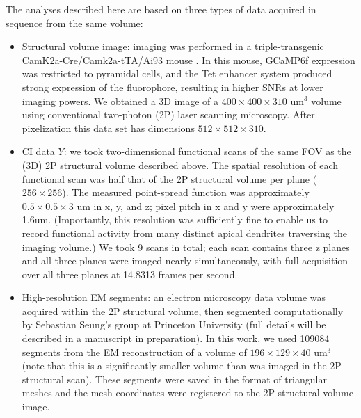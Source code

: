 \documentclass[10pt,letterpaper]{article}
\begin{document}


The analyses described here are based on three types of data acquired in sequence from the same volume:

\begin{itemize}
	\item Structural volume image: imaging was performed in a triple-transgenic CamK2a-Cre/Camk2a-tTA/Ai93 mouse \citep{Madisen2015}. In this mouse, GCaMP6f expression was restricted to pyramidal cells, and the Tet enhancer system produced strong expression of the fluorophore, resulting in higher SNRs at lower imaging powers. We obtained a 3D image of a $400\times 400\times 310$ um$^3$ volume using conventional two-photon (2P) laser scanning microscopy.  After pixelization this data set has dimensions $512\times 512 \times 310$.
	
	\item CI data $Y$: we took two-dimensional functional scans of the same FOV as the (3D) 2P structural volume described above. The spatial resolution of each functional scan was half that of the 2P structural volume per plane ($256\times 256$).  
	The measured point-spread function was  approximately $ 0.5 \times 0.5 \times 3$ um in x, y, and z; pixel pitch in x and y were approximately 1.6um.  (Importantly, this resolution was sufficiently fine to enable us to record functional activity from many distinct apical dendrites traversing the imaging volume.)  We took 9 scans in total; each scan contains three z planes and all three planes were imaged nearly-simultaneously, with full acquisition over all three planes at 14.8313 frames per second. 

    \item High-resolution EM segments: an electron microscopy data volume was acquired within the 2P structural volume, then segmented computationally by Sebastian Seung's group at Princeton University (full details will be described in a manuscript in preparation). In this work, we used 109084 segments from the EM reconstruction of a volume of $196 \times 129\times 40$ um$^3$ (note that this is a significantly smaller volume than was imaged in the 2P structural scan). These segments were saved in the format of triangular meshes and the mesh coordinates were registered to the 2P structural volume image. 
\end{itemize}
\end{document}
